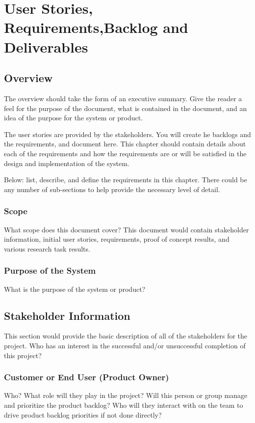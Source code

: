 \chapter{User Stories,  Requirements,Backlog and Deliverables}
\section{Overview}


The overview should take the form of an executive summary.  Give the reader a feel 
for the purpose of the document, what is contained in the document, and an idea 
of the purpose for the system or product. 

 The user stories 
are provided by the stakeholders.  You will create he backlogs and the requirements, and document here.  
This chapter should contain 
details about each of the requirements and how the requirements are or will be 
satisfied in the design and implementation of the system.

Below:   list, describe, and define the requirements in this chapter.  
There could be any number of sub-sections to help provide the necessary level of 
detail. 



\subsection{Scope}


What scope does this document cover?  This document would contain stakeholder information, 
initial user stories, requirements, proof of concept results, and various research 
task results. 



\subsection{Purpose of the System}
What is the purpose of the system or product? 


\section{ Stakeholder Information}


This section would provide the basic description of all of the stakeholders for 
the project.  Who has an interest in the successful and/or unsuccessful completion 
of this project? 


\subsection{Customer or End User (Product Owner)}
Who?  What role will they play in the project?  Will this person or group manage 
and prioritize the product backlog?  Who will they interact with on the team to 
drive product backlog priorities if not done directly? 

